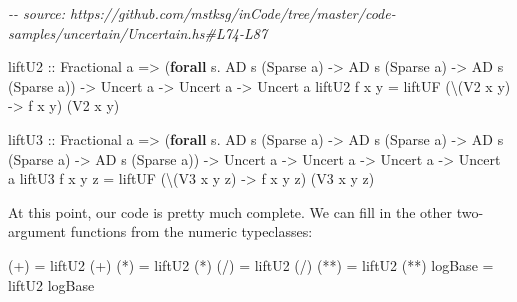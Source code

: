 \documentclass[]{article}
\newenvironment{Shaded}{}{}
\newcommand{\CommentTok}[1]{\textcolor[rgb]{0.38,0.63,0.69}{\textit{#1}}}
\newcommand{\DataTypeTok}[1]{\textcolor[rgb]{0.56,0.13,0.00}{#1}}
\newcommand{\FunctionTok}[1]{\textcolor[rgb]{0.02,0.16,0.49}{#1}}
\newcommand{\KeywordTok}[1]{\textcolor[rgb]{0.00,0.44,0.13}{\textbf{#1}}}
\newcommand{\NormalTok}[1]{#1}
\newcommand{\OperatorTok}[1]{\textcolor[rgb]{0.40,0.40,0.40}{#1}}
\newcommand{\OtherTok}[1]{\textcolor[rgb]{0.00,0.44,0.13}{#1}}
\begin{document}
\begin{Shaded}
\begin{Highlighting}[]
\CommentTok{{-}{-} source: https://github.com/mstksg/inCode/tree/master/code{-}samples/uncertain/Uncertain.hs\#L74{-}L87}

\OtherTok{liftU2 ::} \DataTypeTok{Fractional}\NormalTok{ a}
       \OtherTok{=>}\NormalTok{ (}\KeywordTok{forall}\NormalTok{ s}\OperatorTok{.} \DataTypeTok{AD}\NormalTok{ s (}\DataTypeTok{Sparse}\NormalTok{ a) }\OtherTok{{-}>} \DataTypeTok{AD}\NormalTok{ s (}\DataTypeTok{Sparse}\NormalTok{ a) }\OtherTok{{-}>} \DataTypeTok{AD}\NormalTok{ s (}\DataTypeTok{Sparse}\NormalTok{ a))}
       \OtherTok{{-}>} \DataTypeTok{Uncert}\NormalTok{ a}
       \OtherTok{{-}>} \DataTypeTok{Uncert}\NormalTok{ a}
       \OtherTok{{-}>} \DataTypeTok{Uncert}\NormalTok{ a}
\NormalTok{liftU2 f x y }\OtherTok{=}\NormalTok{ liftUF (\textbackslash{}(}\DataTypeTok{V2}\NormalTok{ x\textquotesingle{} y\textquotesingle{}) }\OtherTok{{-}>}\NormalTok{ f x\textquotesingle{} y\textquotesingle{}) (}\DataTypeTok{V2}\NormalTok{ x y)}

\OtherTok{liftU3 ::} \DataTypeTok{Fractional}\NormalTok{ a}
       \OtherTok{=>}\NormalTok{ (}\KeywordTok{forall}\NormalTok{ s}\OperatorTok{.} \DataTypeTok{AD}\NormalTok{ s (}\DataTypeTok{Sparse}\NormalTok{ a) }\OtherTok{{-}>} \DataTypeTok{AD}\NormalTok{ s (}\DataTypeTok{Sparse}\NormalTok{ a) }\OtherTok{{-}>} \DataTypeTok{AD}\NormalTok{ s (}\DataTypeTok{Sparse}\NormalTok{ a) }\OtherTok{{-}>} \DataTypeTok{AD}\NormalTok{ s (}\DataTypeTok{Sparse}\NormalTok{ a))}
       \OtherTok{{-}>} \DataTypeTok{Uncert}\NormalTok{ a}
       \OtherTok{{-}>} \DataTypeTok{Uncert}\NormalTok{ a}
       \OtherTok{{-}>} \DataTypeTok{Uncert}\NormalTok{ a}
       \OtherTok{{-}>} \DataTypeTok{Uncert}\NormalTok{ a}
\NormalTok{liftU3 f x y z }\OtherTok{=}\NormalTok{ liftUF (\textbackslash{}(}\DataTypeTok{V3}\NormalTok{ x\textquotesingle{} y\textquotesingle{} z\textquotesingle{}) }\OtherTok{{-}>}\NormalTok{ f x\textquotesingle{} y\textquotesingle{} z\textquotesingle{}) (}\DataTypeTok{V3}\NormalTok{ x y z)}
\end{Highlighting}
\end{Shaded}

At this point, our code is pretty much complete. We can fill in the other
two-argument functions from the numeric typeclasses:

\begin{Shaded}
\begin{Highlighting}[]
\NormalTok{(}\OperatorTok{+}\NormalTok{)     }\OtherTok{=}\NormalTok{ liftU2 (}\OperatorTok{+}\NormalTok{)}
\NormalTok{(}\OperatorTok{*}\NormalTok{)     }\OtherTok{=}\NormalTok{ liftU2 (}\OperatorTok{*}\NormalTok{)}
\NormalTok{(}\OperatorTok{/}\NormalTok{)     }\OtherTok{=}\NormalTok{ liftU2 (}\OperatorTok{/}\NormalTok{)}
\NormalTok{(}\OperatorTok{**}\NormalTok{)    }\OtherTok{=}\NormalTok{ liftU2 (}\OperatorTok{**}\NormalTok{)}
\FunctionTok{logBase} \OtherTok{=}\NormalTok{ liftU2 }\FunctionTok{logBase}
\end{Highlighting}
\end{Shaded}
\end{document}

